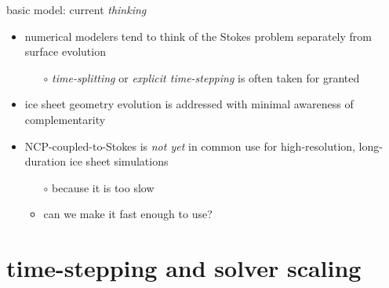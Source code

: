 \documentclass[svgnames,
               hyperref={colorlinks,citecolor=DeepPink4,linkcolor=FireBrick,urlcolor=Maroon},
               usepdftitle=false]  %
               {beamer}
\begin{document}
\begin{frame}{basic model: current \emph{thinking}}

\begin{itemize}
\item numerical modelers tend to think of the Stokes problem separately from surface evolution
    \begin{itemize}
    \item[$\circ$] \emph{time-splitting} or \emph{explicit time-stepping} is often taken for granted
    \end{itemize}

\medskip
\item ice sheet geometry evolution is addressed with minimal awareness of complementarity

\medskip
\item NCP-coupled-to-Stokes is \emph{not yet} in common use for high-resolution, long-duration ice sheet simulations
    \begin{itemize}
    \item[$\circ$] because it is too slow
    \item<2>[$\circ$] \alert{can we make it fast enough to use?}
    \end{itemize}
\end{itemize}
\end{frame}


\section{time-stepping and solver scaling}
\end{document}
